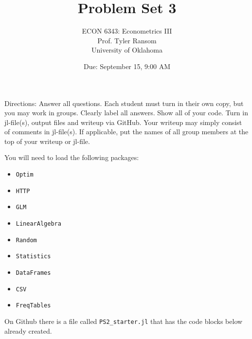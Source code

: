 \documentclass[12pt,english]{article}
\begin{document}
\title{Problem Set 3}
\author{ECON 6343: Econometrics III\\
Prof. Tyler Ransom\\
University of Oklahoma}
\date{Due: September 15, 9:00 AM}

\maketitle
Directions: Answer all questions. Each student must turn in their own copy, but you may work in groups. Clearly label all answers. Show all of your code. Turn in jl-file(s), output files and writeup via GitHub. Your writeup may simply consist of comments in jl-file(s). If applicable, put the names of all group members at the top of your writeup or jl-file.

You will need to load the following packages:
\begin{itemize}
    \item[~] \texttt{Optim} 
    \item[~] \texttt{HTTP} 
    \item[~] \texttt{GLM} 
    \item[~] \texttt{LinearAlgebra} 
    \item[~] \texttt{Random} 
    \item[~] \texttt{Statistics} 
    \item[~] \texttt{DataFrames} 
    \item[~] \texttt{CSV} 
    \item[~] \texttt{FreqTables}
\end{itemize}

On Github there is a file called \texttt{PS2\_starter.jl} that has the code blocks below already created.
\end{document}
